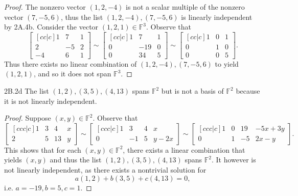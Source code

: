 \documentclass{exam}
\begin{document}
\begin{proof}
    The nonzero vector $(1, 2, -4)$ is not a scalar multiple of the nonzero vector $(7, -5, 6)$, thus the list $(1, 2, -4), (7, -5, 6)$ is linearly independent by 2A.4b. Consider the vector $(1, 2, 1)\in\mathbb F^3$. Observe that \[
        \begin{bmatrix}[cc|c]
            1 & 7 & 1\\
            2 & -5 & 2\\
            -4 & 6 & 1
        \end{bmatrix} \sim \begin{bmatrix}[cc|c]
            1 & 7 & 1\\
            0 & -19 & 0\\
            0 & 34 & 5
        \end{bmatrix} \sim \begin{bmatrix}[cc|c]
            1 & 0 & 1\\
            0 & 1 & 0\\
            0 & 0 & 5
        \end{bmatrix}.
    \]
    Thus there exists no linear combination of $(1, 2, -4
    ), (7, -5, 6)$ to yield $(1, 2, 1)$, and so it does not span $\mathbb F^3$.
\end{proof}

\begin{problem}{2B.2d}
    The list $(1, 2), (3, 5), (4, 13)$ spans $\mathbb F^2$ but is not a basis of $\mathbb F^2$ because it is not linearly independent.
\end{problem}

\begin{proof}
    Suppose $(x, y)\in\mathbb F^2$. Observe that \[
        \begin{bmatrix}[ccc|c]
            1 & 3 & 4 & x\\
            2 & 5 & 13 & y
        \end{bmatrix} \sim \begin{bmatrix}[ccc|c]
            1 & 3 & 4 & x\\
            0 & -1 & 5 & y - 2x
        \end{bmatrix} \sim \begin{bmatrix}[ccc|c]
            1 & 0 & 19 & -5x + 3y\\
            0 & 1 & -5 & 2x - y
        \end{bmatrix}.
    \]
    This shows that for each $(x, y)\in\mathbb F^2$, there exists a linear combination that yields $(x, y)$ and thus the list $(1, 2), (3, 5), (4, 13)$ spans $\mathbb F^2$. It however is not linearly independent, as there exists a nontrivial solution for \[
        a(1, 2) + b(3, 5) + c(4, 13) = 0,
    \]
    i.e. $a = -19, b = 5, c = 1$.
\end{proof}
\end{document}

